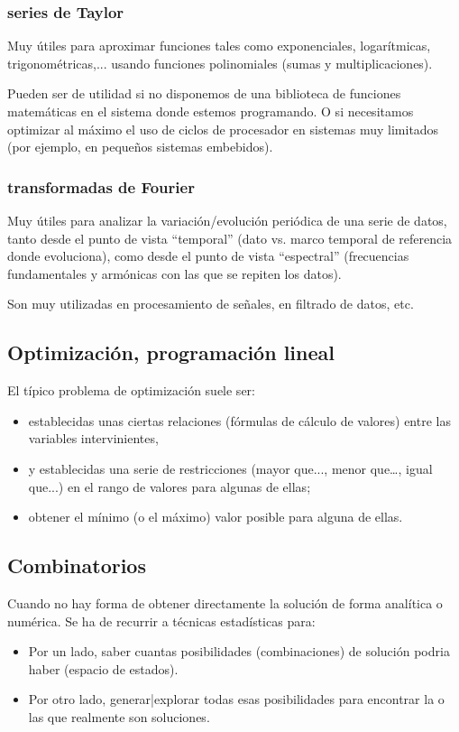 \documentclass[spanish,12pt,a4paper,final,oneside]{book}
\begin{document}
\subsubsection{series de Taylor}
Muy útiles para aproximar funciones tales como exponenciales, logarítmicas, trigonométricas,... usando funciones polinomiales (sumas y multiplicaciones).

Pueden ser de utilidad si no disponemos de una biblioteca de funciones matemáticas en el sistema donde estemos programando. O si necesitamos optimizar al máximo el uso de ciclos de procesador en sistemas muy limitados (por ejemplo, en pequeños sistemas embebidos).

\subsubsection{transformadas de Fourier}
Muy útiles para analizar la variación/evolución periódica de una serie de datos, tanto desde el punto de vista ``temporal'' (dato vs. marco temporal de referencia donde evoluciona), como desde el punto de vista ``espectral'' (frecuencias fundamentales y armónicas con las que se repiten los datos).

Son muy utilizadas en procesamiento de señales, en filtrado de datos, etc.

\subsection{Optimización, programación lineal}
El típico problema de optimización suele ser: 
\begin{itemize}
\item establecidas unas ciertas relaciones (fórmulas de cálculo de valores) entre las variables intervinientes, 
\item y establecidas una serie de restricciones (mayor que..., menor que…, igual que...) en el rango de valores para algunas de ellas; 
\item obtener el mínimo (o el máximo) valor posible para alguna de ellas.
\end{itemize}

\subsection{Combinatorios}
Cuando no hay forma de obtener directamente la solución de forma analítica o numérica. Se ha de recurrir a técnicas estadísticas para:
\begin{itemize}
\item Por un lado, saber cuantas posibilidades (combinaciones) de solución podria haber (espacio de estados).
\item Por otro lado, generar|explorar todas esas posibilidades para encontrar la o las que realmente son soluciones.
\end{itemize}
\end{document}
